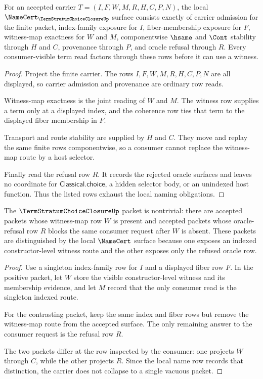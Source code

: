\begin{theorem}
\label{thm:term-stratum-choice-closure-namecert-obligations}
For an accepted carrier $T=(I,F,W,M,R,H,C,P,N)$, the local $\NameCert_{\TermStratumChoiceClosureUp}$ surface consists exactly of carrier admission for the finite packet, index-family exposure for $I$, fiber-membership exposure for $F$, witness-map exactness for $W$ and $M$, componentwise $\hsame$ and $\Cont$ stability through $H$ and $C$, provenance through $P$, and oracle refusal through $R$. Every consumer-visible term read factors through these rows before it can use a witness.
\end{theorem}
\begin{proof}
Project the finite carrier. The rows $I,F,W,M,R,H,C,P,N$ are all displayed, so carrier admission and provenance are ordinary row reads.

Witness-map exactness is the joint reading of $W$ and $M$. The witness row supplies a term only at a displayed index, and the coherence row ties that term to the displayed fiber membership in $F$.

Transport and route stability are supplied by $H$ and $C$. They move and replay the same finite rows componentwise, so a consumer cannot replace the witness-map route by a host selector.

Finally read the refusal row $R$. It records the rejected oracle surfaces and leaves no coordinate for $\mathsf{Classical.choice}$, a hidden selector body, or an unindexed host function. Thus the listed rows exhaust the local naming obligations.
\end{proof}

\begin{theorem}
\label{thm:term-stratum-choice-closure-nontriviality}
The $\TermStratumChoiceClosureUp$ packet is nontrivial: there are accepted packets whose witness-map row $W$ is present and accepted packets whose oracle-refusal row $R$ blocks the same consumer request after $W$ is absent. These packets are distinguished by the local $\NameCert$ surface because one exposes an indexed constructor-level witness route and the other exposes only the refused oracle row.
\end{theorem}
\begin{proof}
Use a singleton index-family row for $I$ and a displayed fiber row $F$. In the positive packet, let $W$ store the visible constructor-level witness and its membership evidence, and let $M$ record that the only consumer read is the singleton indexed route.

For the contrasting packet, keep the same index and fiber rows but remove the witness-map route from the accepted surface. The only remaining answer to the consumer request is the refusal row $R$.

The two packets differ at the row inspected by the consumer: one projects $W$ through $C$, while the other projects $R$. Since the local name row records that distinction, the carrier does not collapse to a single vacuous packet.
\end{proof}

